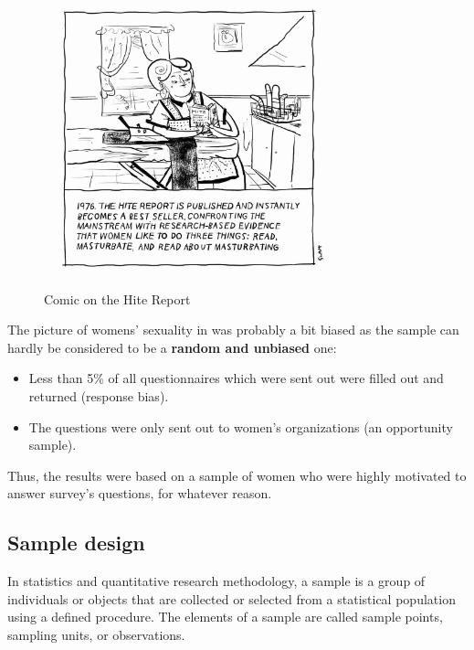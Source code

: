 \documentclass[
  12pt,
  oneside]{book}
\providecommand{\tightlist}{%
  \setlength{\itemsep}{0pt}\setlength{\parskip}{0pt}}
\theoremstyle{definition}
\theoremstyle{definition}
\theoremstyle{definition}
\theoremstyle{definition}
\theoremstyle{remark}
\begin{document}
\begin{figure}
\centering
\includegraphics[width=0.75\textwidth,height=\textheight]{fig/hitereport.jpg}
\caption[\label{fig:hitedo} Comic on the Hite Report]{\label{fig:hitedo} Comic on the Hite Report\footnotemark{}}
\end{figure}

The picture of womens' sexuality in \citet{Hite1976Hite} was probably a bit biased as the sample can hardly be considered to be a \textbf{random and unbiased} one:

\begin{itemize}
\tightlist
\item
  Less than 5\% of all questionnaires which were sent out were filled out and returned (response bias).
\item
  The questions were only sent out to women's organizations (an opportunity sample).
\end{itemize}

Thus, the results were based on a sample of women who were highly motivated to answer survey's questions, for whatever reason.

\hypertarget{sample-design}{%
\subsection{Sample design}\label{sample-design}}

In statistics and quantitative research methodology, a sample is a group of individuals or objects that are collected or selected from a statistical population using a defined procedure. The elements of a sample are called sample points, sampling units, or observations.
\end{document}
